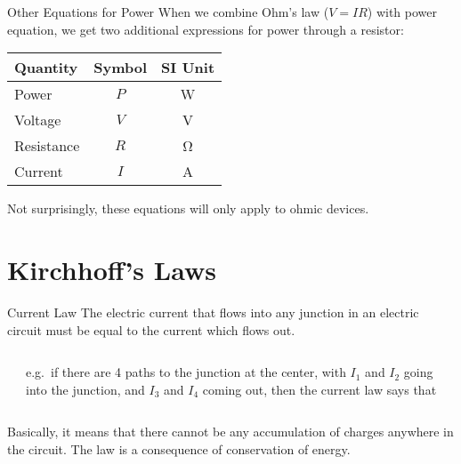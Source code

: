 \documentclass[12pt,aspectratio=169]{beamer}
\newcommand{\eq}[2]{\vspace{#1}{\Large\begin{displaymath}#2\end{displaymath}}}
\begin{document}
\begin{frame}{Other Equations for Power}
  When we combine Ohm's law ($V=IR$) with power equation, we get two additional
  expressions for power through a resistor:

  \eq{-.15in}{
    \boxed{P=\frac{V^2}{R}}\quad\boxed{P=I^2R}
  }
  \begin{center}
    \begin{tabular}{l|c|c}
      \rowcolor{pink}
      \textbf{Quantity} & \textbf{Symbol} & \textbf{SI Unit} \\ \hline
      Power      & $P$ & \si{\watt} \\
      Voltage    & $V$ & \si{\volt} \\
      Resistance & $R$ & \si{\ohm}  \\
      Current    & $I$ & \si{\ampere}
    \end{tabular}
  \end{center}
  Not surprisingly, these equations will only apply to ohmic devices.
\end{frame}


\section{Kirchhoff's Laws}

\begin{frame}{Current Law}
  The electric current that flows into any junction in an electric circuit must
  be equal to the current which flows out.

  \vspace{.2in}
  \begin{columns}
    \begin{center}
    \end{center}
    
    e.g.\ if there are 4 paths to the junction at the center, with $I_1$ and
    $I_2$ going into the junction, and $I_3$ and $I_4$ coming out, then the
    current law says that

    \eq{-.3in}{
      I_1+I_2-I_3-I_4=0
    }
  \end{columns}

  \vspace{.2in}Basically, it means that there cannot be any accumulation of
  charges anywhere in the circuit. The law is a consequence of conservation of
  energy.
\end{frame}
\end{document}
